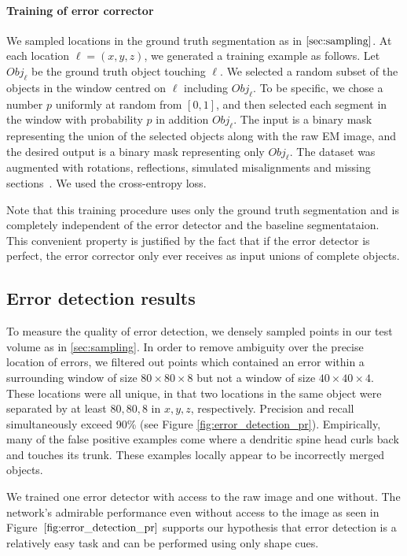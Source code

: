 \documentclass{article}
\begin{document}
\paragraph{Training of error corrector}
We sampled locations in the ground truth segmentation as in $\ref{sec:sampling}$. At each location $\ell = (x,y,z)$, we generated a training example as follows. Let $Obj_\ell$ be the ground truth object touching $\ell$. We selected a random subset of the objects in the window centred on $\ell$ including $Obj_\ell$. To be specific, we chose a number $p$ uniformly at random from $[0,1]$, and then selected each segment in the window with probability $p$ in addition $Obj_\ell$. The input is a binary mask representing the union of the selected objects along with the raw EM image, and the desired output is a binary mask representing only $Obj_\ell$. The dataset was augmented with rotations, reflections, simulated misalignments and missing sections~\cite{kisuk}. We used the cross-entropy loss.

Note that this training procedure uses only the ground truth segmentation and is completely independent of the error detector and the baseline segmentataion. This convenient property is justified by the fact that if the error detector is perfect, the error corrector only ever receives as input unions of complete objects.

\subsection{Error detection results}
\label{sec:detection_results}
To measure the quality of error detection, we densely sampled points in our test volume as in \ref{sec:sampling}. In order to remove ambiguity over the precise location of errors, we filtered out points which contained an error within a surrounding window of size $80\times80\times 8$ but not a window of size $40\times 40 \times 4$. These locations were all unique, in that two locations in the same object were separated by at least $80,80,8$ in $x,y,z$, respectively. Precision and recall simultaneously exceed 90\% (see Figure \ref{fig:error_detection_pr}). Empirically, many of the false positive examples come where a dendritic spine head curls back and touches its trunk. These examples locally appear to be incorrectly merged objects.

We trained one error detector with access to the raw image and one without. The network's admirable performance even without access to the image as seen in Figure~$\ref{fig:error_detection_pr}$ supports our hypothesis that error detection is a relatively easy task and can be performed using only shape cues.
\end{document}
